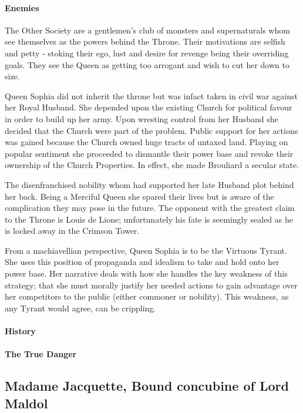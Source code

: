 \begin{multicols}{2}
    \paragraph{Enemies} The Other Society are a gentlemen's club of monsters and supernaturals whom see themselves as the powers behind the Throne. Their motivations are selfish and petty - stoking their ego, lust and desire for revenge being their overriding goals. They see the Queen as getting too arrogant and wish to cut her down to size. 
    
    Queen Sophia did not inherit the throne but was infact taken in civil war against her Royal Husband. She depended upon the existing Church for political favour in order to build up her army. Upon wresting control from her Husband she decided that the Church were part of the problem. Public support for her actions was gained because the Church owned huge tracts of untaxed land. Playing on popular sentiment she proceeded to dismantle their power base and revoke their ownership of the Church Properties. In effect, she made Brouliard a secular state.
    
    The disenfranchised nobility whom had supported her late Husband plot behind her back. Being a Merciful Queen she spared their lives but is aware of the complication they may pose in the future. The opponent with the greatest claim to the Throne is Louis de Lione; unfortunately his fate is seemingly sealed as he is locked away in the Crimson Tower.
\begin{framed}\centering
From a machiavellian perspective, Queen Sophia is to be the Virtuous Tyrant. She uses this position of propaganda and idealism to take and hold onto her power base. Her narrative deals with how she handles the key weakness of this strategy; that she must morally justify her needed actions to gain advantage over her competitors to the public (either commoner or nobility). This weakness, as any Tyrant would agree, can be crippling.
\end{framed}    
    
    \paragraph{History}
    \paragraph{The True Danger}
 
\subsection{Madame Jacquette, Bound concubine of Lord Maldol} 

\end{multicols}
